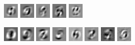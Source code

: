 \documentclass[notitlepage]{revtex4-1}
\begin{document}
\begin{figure}
\begin{subfigure}{\linewidth}
    \includegraphics[width=.05\linewidth]{X_l_eigv_7.png}
    \includegraphics[width=.05\linewidth]{X_l_eigv_8.png}
    \includegraphics[width=.05\linewidth]{X_l_eigv_9.png}
    \includegraphics[width=.05\linewidth]{X_l_eigv_10.png}
    \includegraphics[width=.05\linewidth]{X_l_eigv_11.png}
    \caption{}
    \label{fig:modes_data}
  \end{subfigure}
  \begin{subfigure}{\linewidth}
    \includegraphics[width=.05\linewidth]{W_l_eigv_1.png}
    \includegraphics[width=.05\linewidth]{W_l_eigv_2.png}
    \includegraphics[width=.05\linewidth]{W_l_eigv_3.png}
    \includegraphics[width=.05\linewidth]{W_l_eigv_4.png}
    \includegraphics[width=.05\linewidth]{W_l_eigv_5.png}
    \includegraphics[width=.05\linewidth]{W_l_eigv_6.png}
    \includegraphics[width=.05\linewidth]{W_l_eigv_7.png}
    \includegraphics[width=.05\linewidth]{W_l_eigv_8.png}

\end{subfigure}
\end{figure}
\end{document}
